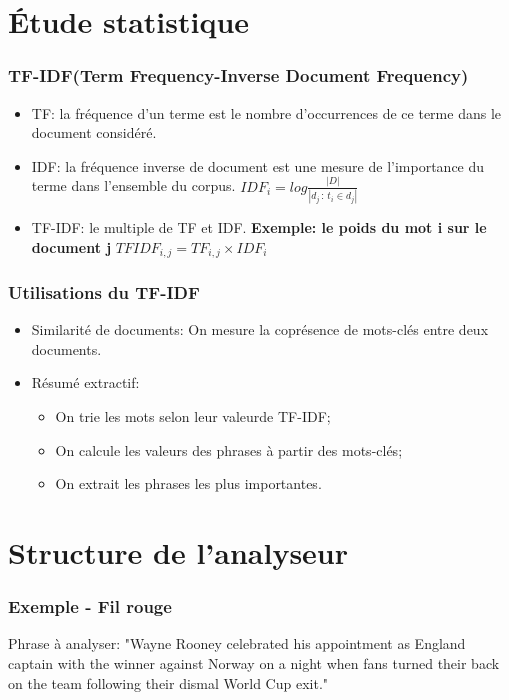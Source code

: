 \documentclass{beamer}
\begin{document}
\section{Étude statistique}
    \begin{frame}
    \frametitle{TF-IDF(Term Frequency-Inverse Document Frequency)}
        \begin{itemize}
            \item TF: la fréquence d'un terme est le nombre d'occurrences de ce terme dans le document considéré.
            \item IDF: la fréquence inverse de document est une mesure de l'importance du terme dans l'ensemble du corpus.
                $IDF_{i}=log \frac{|D|}{|d_{j}\,:\,t_{i}\in d_{j}|}$
            \item TF-IDF: le multiple de TF et IDF.\newline{}
                \textbf{Exemple: le poids du mot i sur le document j}
                $TFIDF_{i,j} = TF_{i,j} \times IDF_{i}$
        \end{itemize}
    \end{frame}

    \begin{frame}
    \frametitle{Utilisations du TF-IDF}
        \begin{itemize}
        \item Similarité de documents:\newline{}
        On mesure la coprésence de mots-clés entre deux documents.
        \item Résumé extractif:
            \begin{itemize}
                \item On trie les mots selon leur valeurde TF-IDF;
                \item On calcule les valeurs des phrases à partir des mots-clés;
                \item On extrait les phrases les plus importantes.
            \end{itemize}
        \end{itemize}
    \end{frame}

\section{Structure de l'analyseur}%
    \begin{frame}
        \frametitle{Exemple - Fil rouge}
        Phrase à analyser:\newline{}
        "Wayne Rooney celebrated his appointment as England captain with the winner against Norway on a night when
        fans turned their back on the team following their dismal World Cup exit."
    \end{frame}
\end{document}
